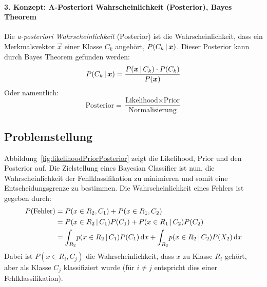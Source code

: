 			\paragraph{3. Konzept: A-Posteriori Wahrscheinlichkeit (Posterior), Bayes Theorem}
				Die \emph{a-posteriori Wahrscheinlichkeit} (Posterior) ist die Wahrscheinlichkeit, dass ein Merkmalsvektor \(\vec{x}\) einer Klasse \( C_k \) angehört, \dh \( P(C_k \,\vert\, \bm{x}) \). Dieser Posterior kann durch Bayes Theorem gefunden werden:
				\begin{equation*}
					P(C_k \,\vert\, \bm{x}) = \frac{P(\bm{x} \,\vert\, C_k) \cdot P(C_k)}{P(\bm{x})}
				\end{equation*}
				Oder namentlich:
				\begin{equation*}
					\text{Posterior} = \frac{\text{Likelihood} \times \text{Prior}}{\text{Normalisierung}}
				\end{equation*}

		\subsection{Problemstellung}
			Abbildung~\ref{fig:likelihoodPriorPosterior} zeigt die Likelihood, Prior und den Posterior auf. Die Zielstellung eines Bayesian Classifier ist nun, die Wahrscheinlichkeit der Fehlklassifikation zu minimieren und somit eine Entscheidungsgrenze zu bestimmen. Die Wahrscheinlichkeit eines Fehlers ist gegeben durch:
			\begin{align*}
				P(\text{Fehler}) & = P(x \in R_2, C_1) + P(x \in R_1, C_2)                                                                     \\
				                 & = P(x \in R_2 \,\vert\, C_1) P(C_1) + P(x \in R_1 \,\vert\, C_2) P(C_2)                                           \\
				                 & = \int_{R_2} \! p(x \in R_2 \,\vert\, C_1) P(C_1) \dd{x} + \int_{R_2} \! p(x \in R_2 \,\vert\, C_2) P(X_2) \dd{x}
			\end{align*}
			Dabei ist \( P(x \in R_i, C_j) \) die Wahrscheinlichkeit, dass \(x\) zu Klasse \(R_i\) gehört, aber als Klasse \(C_j\) klassifiziert wurde (für \( i \neq j \) entspricht dies einer Fehlklassifikation).

